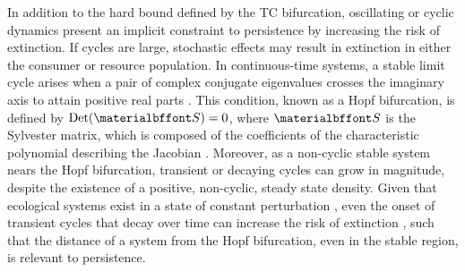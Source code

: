 \documentclass{pnastwo}
\begin{document}
\begin{article}
In addition to the hard bound defined by the TC bifurcation, oscillating or cyclic dynamics present an implicit constraint to persistence by increasing the risk of extinction.
If cycles are large, stochastic effects may result in extinction in either the consumer or resource population.
In continuous-time systems, a stable limit cycle arises when a pair of complex conjugate eigenvalues crosses the imaginary axis to attain positive real parts \cite{GuckHolmes}.
This condition, known as a Hopf bifurcation, is defined by ${\rm Det}({\bf S}) = 0$, where $\bf S$ is the Sylvester matrix, which is composed of the coefficients of the characteristic polynomial describing the Jacobian \cite{Gross:2004p2428}.
Moreover, as a non-cyclic stable system nears the Hopf bifurcation, transient or decaying cycles can grow in magnitude, despite the existence of a positive, non-cyclic, steady state density.
Given that ecological systems exist in a state of constant perturbation \cite{Hastings:2001jh}, even the onset of transient cycles that decay over time can increase the risk of extinction \cite{Neubert:1997wk,Caswell:2005eo,Neubert:2009td}, such that the distance of a system from the Hopf bifurcation, even in the stable region, is relevant to persistence.









\end{article}
\end{document}
